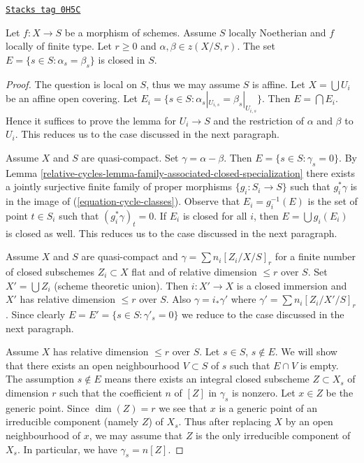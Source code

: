 \begin{lemma}
\label{relative-cycles-lemma-relative-cycles-equal}
\href{https://stacks.math.columbia.edu/tag/0H5C}{\texttt{Stacks tag 0H5C}}

Let $f : X \to S$ be a morphism of schemes. Assume $S$ locally Noetherian
and $f$ locally of finite type. Let $r \geq 0$ and
$\alpha, \beta \in z(X/S, r)$. The set $E = \{s \in S : \alpha_s = \beta_s\}$
is closed in $S$.
\end{lemma}

\begin{proof}
The question is local on $S$, thus we may assume $S$ is affine.
Let $X = \bigcup U_i$ be an affine open covering. Let
$E_i = \{s \in S : \alpha_s|_{U_{i, s}} = \beta_s|_{U_{i, s}}\}$.
Then $E = \bigcap E_i$. Hence it suffices to prove the lemma for
$U_i \to S$ and the restriction of $\alpha$ and $\beta$ to $U_i$.
This reduces us to the case discussed in the next paragraph.

\medskip\noindent
Assume $X$ and $S$ are quasi-compact.
Set $\gamma = \alpha - \beta$. Then $E = \{s \in S : \gamma_s = 0\}$.
By Lemma \ref{relative-cycles-lemma-family-associated-closed-specialization}
there exists a jointly surjective finite family of proper morphisms
$\{g_i : S_i \to S\}$ such that $g_i^*\gamma$ is in the image
of (\ref{equation-cycle-classes}). Observe that $E_i = g_i^{-1}(E)$ is
the set of point $t \in S_i$ such that $(g_i^*\gamma)_t = 0$.
If $E_i$ is closed for all $i$, then $E = \bigcup g_i(E_i)$
is closed as well. This reduces us to the case discussed in the next
paragraph.

\medskip\noindent
Assume $X$ and $S$ are quasi-compact and $\gamma = \sum n_i[Z_i/X/S]_r$
for a finite number of closed subschemes $Z_i \subset X$
flat and of relative dimension $\leq r$ over $S$.
Set $X' = \bigcup Z_i$ (scheme theoretic union).
Then $i : X' \to X$ is a closed immersion and $X'$
has relative dimension $\leq r$ over $S$. Also
$\gamma = i_*\gamma'$ where $\gamma' = \sum n_i[Z_i/X'/S]_r$.
Since clearly $E = E' = \{s \in S : \gamma'_s = 0\}$
we reduce to the case discussed in the next paragraph.

\medskip\noindent
Assume $X$ has relative dimension $\leq r$ over $S$.
Let $s \in S$, $s \not \in E$. We will show that there exists an
open neighbourhood $V \subset S$ of $s$ such that $E \cap V$ is empty.
The assumption $s \not \in E$ means there exists an integral closed
subscheme $Z \subset X_s$ of dimension $r$ such that the coefficient
$n$ of $[Z]$ in $\gamma_s$ is nonzero. Let $x \in Z$ be the
generic point. Since $\dim(Z) = r$ we see that $x$ is a generic
point of an irreducible component (namely $Z$) of $X_s$.
Thus after replacing $X$ by an open neighbourhood of $x$,
we may assume that $Z$ is the only irreducible component of $X_s$.
In particular, we have $\gamma_s = n[Z]$.


\end{proof}
